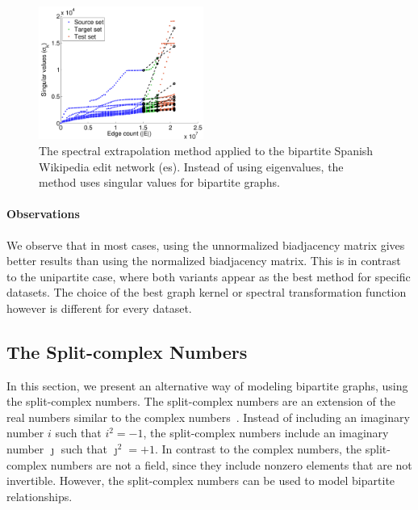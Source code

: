 \documentclass[11pt,a4paper]{book}
\newcommand{\wTwo}{0.48}
\begin{document}
\begin{figure}[h!]
  \centering
  \includegraphics[width=\wTwo\textwidth]{img-st/time.sne.svd.edit-eswiki}
  \caption{
    The spectral extrapolation method applied to the bipartite Spanish
    Wikipedia edit network (\textsf{es}).  Instead of using eigenvalues,
    the method uses singular values for bipartite graphs. 
  }
  \label{fig:bipartite-extrapolation}
\end{figure}

\paragraph{Observations}
We observe that in most cases, using the unnormalized biadjacency matrix
gives better results than using the normalized biadjacency matrix.  This
is in contrast to the unipartite case, where both variants appear as the
best method for specific datasets. The choice of the best graph kernel or
spectral transformation function however is different for every
dataset. 

\subsection{The Split-complex Numbers}
In this section, we present an alternative way of modeling bipartite
graphs, using the split-complex numbers.  The split-complex numbers 
are an extension of the real numbers similar to the complex numbers~\cite{b648}.  
Instead of including an imaginary number $i$ such that $i^2=-1$, the
split-complex numbers include an imaginary number $\jmath$ such that $\jmath^2 =
+1$. In contrast to the complex numbers, the split-complex numbers are
not a field, since they include nonzero elements that are not invertible. However,
the split-complex numbers can be used to model bipartite
relationships. 
\end{document}
